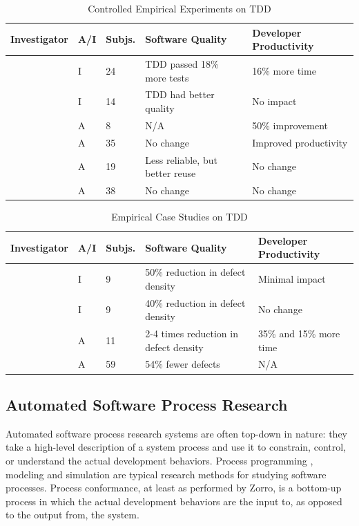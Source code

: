 \documentclass[smallextended]{svjour3}     %
\begin{document}
\begin{table}[ht]
\caption{Controlled Empirical Experiments on TDD}
\begin{tabular}{|l|l|l|p{1.0in}|p{1.0in}|} \hline 
Investigator      & A/I & Subjs.	& Software Quality	& Developer Productivity \\ \hline
\cite{George:04}  & I & 24	& TDD passed 18\% more tests & 16\% more time \\ \hline
\cite{Geras:04}   & I & 14	& TDD had better quality & No impact \\ \hline 
\cite{Kaufmann:03}& A &  8 & N/A	    & 50\% improvement \\ \hline
\cite{Erdogmus:05}& A & 35	& No change	  & Improved productivity \\ \hline
\cite{Muller:02}  & A & 19 & Less reliable, but better reuse	& No change \\ \hline
\cite{Matjaz:03}  & A & 38	& No change	  & No change \\ \hline
\end{tabular}
\label{tab:ControlledTDDResearch}
\end{table}

\begin{table}[ht]
\caption{Empirical Case Studies on TDD}
\begin{tabular}{|l|l|l|p{1.0in}|p{1.0in}|} \hline 
Investigator        & A/I      & Subjs.	& Software Quality	& Developer Productivity \\ \hline
\cite{Maximilien:03}& I &  9	& 50\% reduction in defect density	& Minimal impact \\ \hline
\cite{Williams:03}  & I & 9	& 40\% reduction in defect density	& No change \\ \hline
\cite{Bhat:06}      & A & 11	& 2-4 times reduction in defect density	& 35\% and 15\% more time \\  \hline
\cite{Edwards:04}   & A & 59	& 54\% fewer defects	& N/A \\ \hline
\end{tabular}
\label{tab:CaseStudyTDDResearch}
\end{table}


\subsection{Automated Software Process Research}
\label{sec:related-automation}

Automated software process research systems are often top-down in nature:
they take a high-level description of a system process and use it to
constrain, control, or understand the actual development behaviors.
Process programming \citep{Sutton:95}, modeling \citep{Curtis:92} and
simulation \citep{Turnu:04,Jensen:05} are typical research methods for
studying software processes.  Process conformance, at least as performed by Zorro,
is a bottom-up process in which the actual development behaviors are
the input to, as opposed to the output from, the system.
\end{document}
